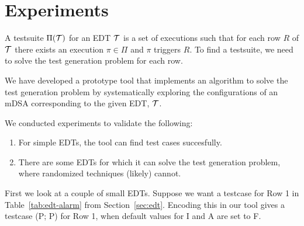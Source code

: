 \section{Experiments}
\label{sec:experiments}
A testsuite $\Pi(\mathcal{T})$ for an EDT $\mathcal{T}$ is a set of executions such
that for each row $R$ of $\mathcal{T}$ there exists an execution
$\pi \in \Pi$ and $\pi$ triggers $R$. To find a testsuite, we need to solve the test generation problem for each row.

We have developed a prototype tool that implements an
algorithm to solve the test generation problem by systematically
exploring the configurations of an mDSA corresponding to the given EDT,
$\mathcal{T}$.  %

We conducted experiments to validate the following:

\begin{enumerate}
\item For simple EDTs, the tool can find test cases succesfully.
\item There are some EDTs for which it can solve the test
  generation problem, where randomized techniques (likely) cannot.
\end{enumerate}


First we look at a couple of small EDTs. Suppose we want a testcase for Row 1 in Table~\ref{tab:edt-alarm} from Section~\ref{sec:edt}. Encoding this in our tool gives a testcase (P; P) for Row 1, when default values for I and A are set to F.

%
%  


